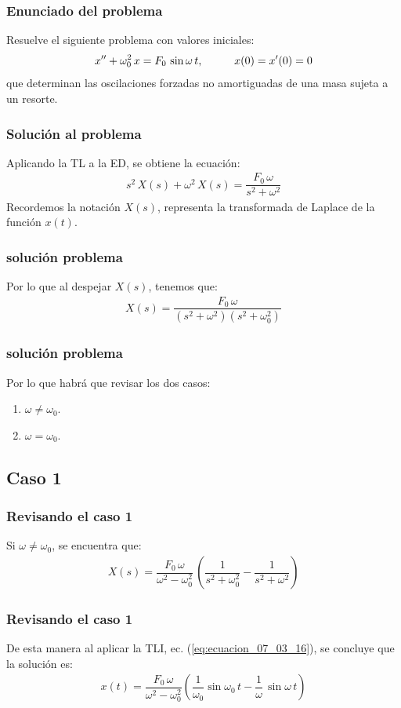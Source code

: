 \begin{frame}
\frametitle{Enunciado del problema}
Resuelve el siguiente problema con valores iniciales:
\pause
\begin{align*}
{x}^{\prime \prime} + \omega_{0}^{2} \, x = F_{0} \, \sin \omega \, t, \hspace{1cm} x(0) = {x}^{\prime} (0) = 0
\end{align*}
que determinan las oscilaciones forzadas no amortiguadas de una masa sujeta a un resorte.
\end{frame}
\begin{frame}
\frametitle{Solución al problema}
Aplicando la TL a la ED, se obtiene la ecuación:
\pause
\begin{align*}
s^{2} \, X(s) + \omega^{2} \, X(s) = \dfrac{F_{0} \, \omega}{s^{2} + \omega^{2}}
\end{align*}
Recordemos la notación $X(s)$, representa la transformada de Laplace de la función $x(t)$.
\end{frame}
\begin{frame}
\frametitle{solución problema}    
Por lo que al despejar $X(s)$, tenemos que:
\pause
\begin{align*}
X(s) = \dfrac{F_{0} \, \omega}{(s^{2} + \omega^{2})(s^{2} + \omega_{0}^{2})}
\end{align*}
\end{frame}
\begin{frame}
\frametitle{solución problema}    
Por lo que habrá que revisar los dos casos:
\pause
{}
\begin{enumerate}[<+->]
\item $\omega \neq \omega_{0}$.
\item $\omega = \omega_{0}$.
\end{enumerate}
\end{frame}

\subsection*{Caso 1}

\begin{frame}
\frametitle{Revisando el caso 1}
Si $\omega \neq \omega_{0}$, se encuentra que:
\pause
\begin{align*}
X(s) = \dfrac{F_{0} \, \omega}{\omega^{2} - \omega_{0}^{2}} \, \left( \dfrac{1}{s^{2}+ \omega_{0}^{2}} - \dfrac{1}{s^{2} + \omega^{2}} \right)
\end{align*}
\end{frame}
\begin{frame}
\frametitle{Revisando el caso 1}
De esta manera al aplicar la TLI, ec. (\ref{eq:ecuacion_07_03_16}), se concluye que la solución es:
\pause
\begin{align*}
x(t) = \dfrac{F_{0} \, \omega}{\omega^{2} - \omega_{0}^{2}} \left( \dfrac{1}{\omega_{0}} \sin \omega_{0} \, t - \dfrac{1}{\omega} \, \sin \omega \, t \right)
\end{align*}
\end{frame}

